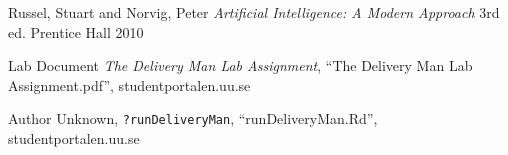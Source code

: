 \vspace{\fill}
\begin{thebibliography}{1}
   Russel, Stuart and Norvig, Peter \emph{Artificial Intelligence:
    A Modern Approach} 3rd ed. Prentice Hall 2010

   Lab Document \emph{The Delivery Man Lab Assignment},
    ``The Delivery Man Lab Assignment.pdf'', studentportalen.uu.se

   Author Unknown, \texttt{?runDeliveryMan},
    ``runDeliveryMan.Rd'', studentportalen.uu.se
    
\end{thebibliography}
